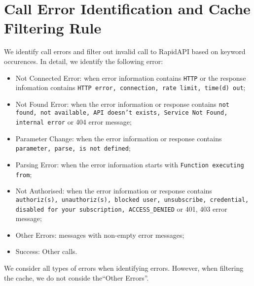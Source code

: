 \section{Call Error Identification and Cache Filtering Rule}\label{app:filter_rule}
We identify call errors and filter out invalid call to RapidAPI based on keyword occurences. In detail, we identify the following error:
\begin{itemize}
    \item Not Connected Error: when error information contains \texttt{HTTP} or the response infomation contains \texttt{HTTP error, connection, rate limit, time(d) out};
    \item Not Found Error: when the error information or response contains \texttt{not found, not available, API doesn't exists, Service Not Found, internal error} or 404 error message;
    \item Parameter Change: when the error information or response contains \texttt{parameter, parse, is not defined};
    \item Parsing Error: when the error information starts with \texttt{Function executing from};
    \item Not Authorised: when the error information or response contains \texttt{authoriz(s), unauthoriz(s), blocked user, unsubscribe, credential, disabled for your subscription, ACCESS\_DENIED} or 401, 403 error message;
    \item Other Errors: messages with non-empty error messages;
    \item Success: Other calls.
\end{itemize}
We consider all types of errors when identifying errors. However, when filtering the cache, we do not conside the``Other Errors''.

